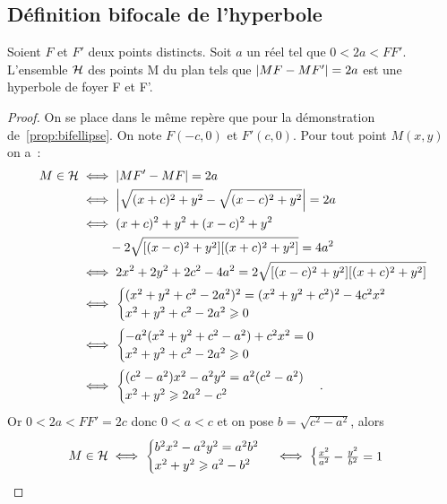\subsection{Définition bifocale de l'hyperbole}
\begin{prop}
  Soient \(F\) et \(F'\) deux points distincts. Soit \(a\) un réel tel que
  \(0<2a<FF'\). L'ensemble \(\mathcal{H}\) des points M du plan tels que
  \(\left\lvert MF-MF'\right\rvert = 2a\) est une hyperbole de foyer F et F'.
\end{prop}
\begin{proof}
  On se place dans le même repère que pour la démonstration
  de~\ref{prop:bifellipse}. On note \(F(-c, 0)\) et \(F'(c, 0)\). Pour tout
  point \(M(x, y)\)  on a~:
  \begin{align}
    M \in \mathcal{H} & \iff \left\lvert MF'-MF\right\rvert = 2a \\
             & \iff \left\lvert\sqrt{(x + c)^2 + y^2}-\sqrt{(x-c)^2 + y^2}\right\rvert = 2a \\
             & \iff (x + c)^2 +y^2 + (x-c)^2 + y^2 \notag \\ & \phantom{\iff}
             -2\sqrt{[(x-c)^2 + y^2][(x + c)^2 + y^2]} = 4a^2\\
             & \iff 2x^2 + 2y^2 + 2c^2-4a^2 = 2\sqrt{[(x-c)^2 + y^2][(x + c)^2 + y^2]}\\
             & \iff \begin{cases}(x^2 + y^2 + c^2-2a^2)^2 = (x^2 + y^2 + c^2)^2-4c^2x^2
             \\ x^2 + y^2 + c^2-2a^2 \geqslant 0\end{cases}\\
             & \iff \begin{cases}-a^2(x^2 + y^2 + c^2-a^2) + c^2x^2 = 0 \\
             x^2 + y^2 + c^2-2a^2 \geqslant 0\end{cases}\\
             & \iff \begin{cases}(c^2-a^2)x^2 - a^2y^2 = a^2(c^2-a^2) \\ x^2 + y^2
             \geqslant 2a^2-c^2\end{cases}.
  \end{align}
  Or \(0<2a<FF' = 2c\) donc \(0<a<c\) et on pose \(b = \sqrt{c^2-a^2}\), alors
  \begin{equation}
    M \in \mathcal{H} \iff \begin{cases}b^2x^2 - a^2y^2 = a^2b^2 \\ x^2 + y^2 \geqslant
      a^2-b^2\end{cases}\iff\begin{cases}\frac{x^2}{a^2} - \frac{y^2}{b^2} = 1

\end{cases}
\end{equation}
\end{proof}
